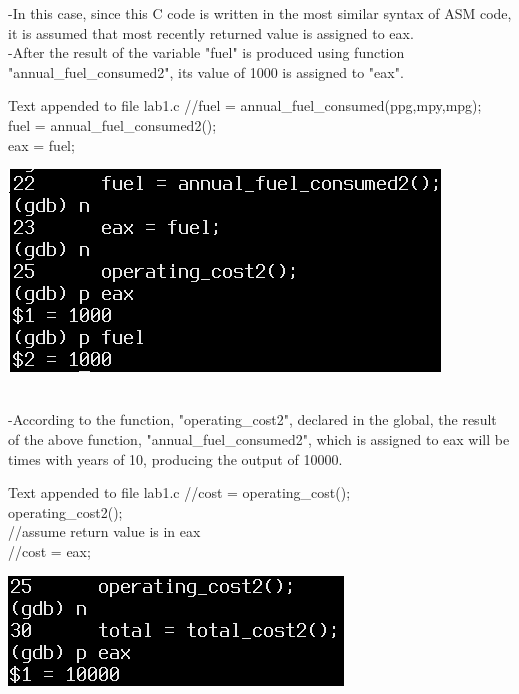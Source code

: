 \documentclass{article}
\begin{document}
-In this case, since this C code is written in the most similar syntax of ASM code, it is assumed that most recently returned value is assigned to eax. \\
-After the result of the variable "fuel" is produced using function "annual_fuel_consumed2", its value of 1000 is assigned to "eax".
\begin{multicols}{2}
\begin{GFT}{Text appended to file lab1.c}
\+//fuel = annual\_fuel\_consumed(ppg,mpy,mpg);\\
\+fuel = annual\_fuel\_consumed2();\\
\+eax = fuel;\\
\end{GFT}
\columnbreak
\raggedleft
\includegraphics[scale=0.4]{afcc.png}
\end{multicols}
\noindent{\color{red}\rule{\linewidth}{0.5mm}} \\

-According to the function, "operating_cost2", declared in the global, the result of the above function, "annual_fuel_consumed2", which is assigned to eax will be times with years of 10, producing the output of 10000. 
\begin{multicols}{2}
\begin{GFT}{Text appended to file lab1.c}
\+//cost = operating\_cost();\\
\+operating\_cost2(); \\
\+//assume return value is in eax\\
\+//cost = eax;\\
\end{GFT}
\columnbreak
\raggedleft
\includegraphics[scale=0.5]{occ.png}
\end{multicols}
\noindent{\color{red}\rule{\linewidth}{0.5mm}} \\
\clearpage
\end{document}
